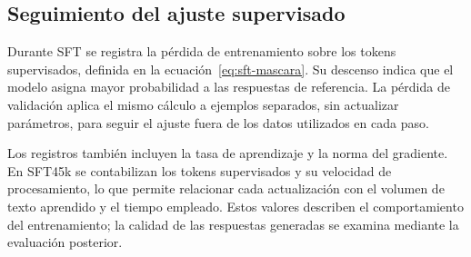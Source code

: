\subsection{Seguimiento del ajuste supervisado}
\label{sec:metricas-sft}
Durante SFT se registra la pérdida de entrenamiento sobre los tokens supervisados, definida en la ecuación~\ref{eq:sft-mascara}. Su descenso indica que el modelo asigna mayor probabilidad a las respuestas de referencia. La pérdida de validación aplica el mismo cálculo a ejemplos separados, sin actualizar parámetros, para seguir el ajuste fuera de los datos utilizados en cada paso.

Los registros también incluyen la tasa de aprendizaje y la norma del gradiente. En SFT45k se contabilizan los tokens supervisados y su velocidad de procesamiento, lo que permite relacionar cada actualización con el volumen de texto aprendido y el tiempo empleado. Estos valores describen el comportamiento del entrenamiento; la calidad de las respuestas generadas se examina mediante la evaluación posterior.
